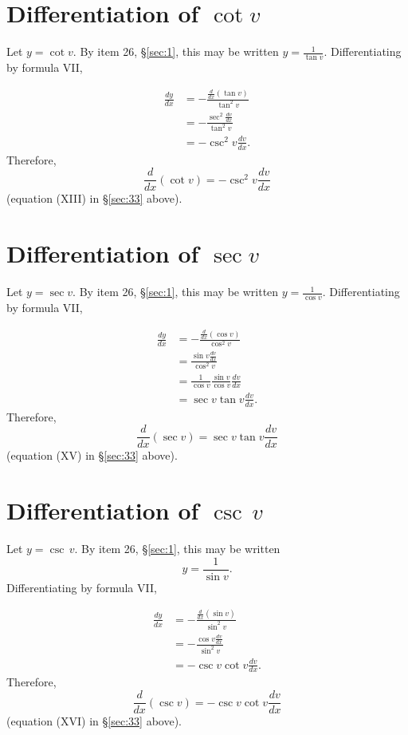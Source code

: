 \section{Differentiation of $\cot v$}

Let $y 	= \cot v$.
By item 26, \S \ref{sec:1}, %
this may be written $y 	= \frac{1}{\tan v}$.
Differentiating by formula VII,

\[
\begin{array}{ll}
  	\frac{dy}{dx}
& 	= - \frac{\frac{d}{dx}(\tan v)}{\tan^2 v}\\
&  	= -\frac{\sec^2 \frac{dv}{dx}}{\tan^2 v} \\
& = -\csc^2 v \frac{dv}{dx}.
\end{array}
\]
Therefore, 
\[
\frac{d}{dx}(\cot v) 	= -\csc^2 v \frac{dv}{dx}
\]
(equation (XIII) in \S \ref{sec:33}  above).

\section{Differentiation of $\sec v$}

Let $y = \sec v$.
By item 26,  \S \ref{sec:1}, %
this may be written
$y 	= \frac{1}{\cos v}$.
Differentiating by formula VII,

\[
\begin{array}{ll}
\frac{dy}{dx} 
&	= -\frac{\frac{d}{dx}(\cos v)}{\cos^2 v}\\
&  	=\frac{\sin v \frac{dv}{dx}}{\cos^2 v}\\
&  	= \frac{1}{\cos v} \frac{\sin v}{\cos v} \frac{dv}{dx}\\
&  	= \sec v \tan v \frac{dv}{dx}.
\end{array}
\]
Therefore, 
\[
\frac{d}{dx}(\sec v) 	= \sec v \tan v \frac{dv}{dx}
\]
(equation (XV) in \S \ref{sec:33}  above).

\section{Differentiation of $\csc\, v$}

Let $y 	= \csc\, v$.
By item 26, \S \ref{sec:1}, %
this may be written
\[
  	y 	= \frac{1}{\sin v}.
\]
Differentiating by formula VII,

\[
\begin{array}{ll}
\frac{dy}{dx} 
&	= -\frac{\frac{d}{dx}(\sin v)}{\sin^2 v}\\
 & 	= -\frac{\cos v \frac{dv}{dx}}{\sin^2 v}\\
  &	= -\csc v \cot v \frac{dv}{dx}.
\end{array}
\]
Therefore, 
\[
\frac{d}{dx}(\csc v) 	= - \csc v \cot v \frac{dv}{dx}
\]
(equation (XVI) in \S \ref{sec:33}  above).

